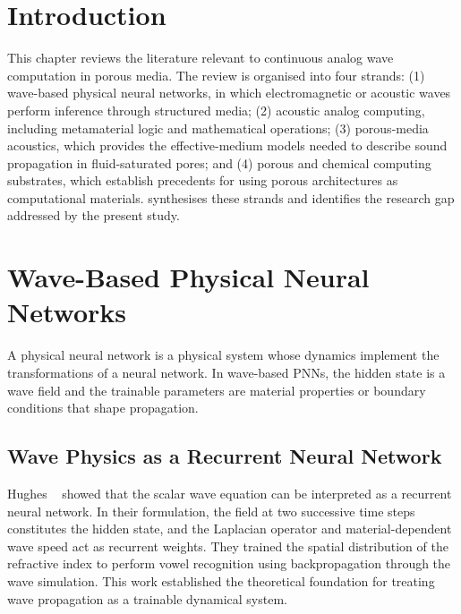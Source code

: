 
\section{Introduction}
\label{sec:lr_intro}

This chapter reviews the literature relevant to continuous analog wave computation in porous media. The review is organised into four strands: (1) wave-based physical neural networks, in which electromagnetic or acoustic waves perform inference through structured media; (2) acoustic analog computing, including metamaterial logic and mathematical operations; (3) porous-media acoustics, which provides the effective-medium models needed to describe sound propagation in fluid-saturated pores; and (4) porous and chemical computing substrates, which establish precedents for using porous architectures as computational materials.  synthesises these strands and identifies the research gap addressed by the present study.

\section{Wave-Based Physical Neural Networks}
\label{sec:wave_pnn}

A physical neural network is a physical system whose dynamics implement the transformations of a neural network. In wave-based PNNs, the hidden state is a wave field and the trainable parameters are material properties or boundary conditions that shape propagation.

\subsection{Wave Physics as a Recurrent Neural Network}
\label{subsec:hughes_rnn}

Hughes \etal\ \cite{hughes2019wave} showed that the scalar wave equation can be interpreted as a recurrent neural network. In their formulation, the field at two successive time steps constitutes the hidden state, and the Laplacian operator and material-dependent wave speed act as recurrent weights. They trained the spatial distribution of the refractive index to perform vowel recognition using backpropagation through the wave simulation. This work established the theoretical foundation for treating wave propagation as a trainable dynamical system.

